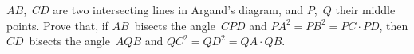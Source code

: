 $AB$,~$CD$ are two intersecting lines in Argand's diagram, and $P$,~$Q$
their middle points. Prove that, if $AB$~bisects the angle~$CPD$ and
$PA^{2} = PB^{2} = PC · PD$, then $CD$~bisects the angle~$AQB$ and $QC^{2} = QD^{2} = QA · QB$.

